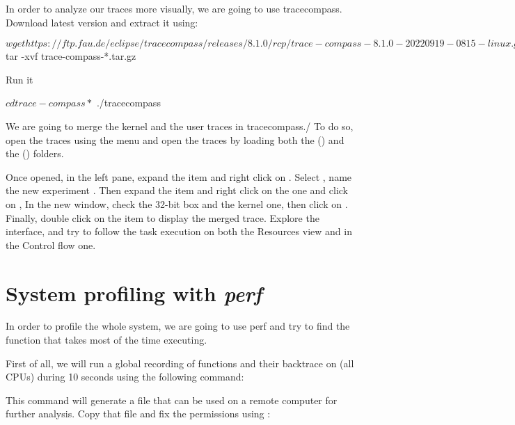 In order to analyze our traces more visually, we are going to use tracecompass.
Download  latest version and extract it using:

\begin{bashinput}
$ wget https://ftp.fau.de/eclipse/tracecompass/releases/8.1.0/rcp/trace-compass-8.1.0-20220919-0815-linux.gtk.x86_64.tar.gz
$ tar -xvf trace-compass-*.tar.gz
\end{bashinput}

Run it
\begin{bashinput}
$ cd trace-compass*
$ ./tracecompass
\end{bashinput}

We are going to merge the kernel and the user traces in tracecompass./ To do so,
open the traces using the  menu and open the traces
by loading both the  () and the 
() folders.

Once opened, in the left pane, expand the  item and right click
on . Select , name the new experiment
. Then expand the  item and right click on
the  one and click on , In the new
window, check the 32-bit box and the kernel one, then click on .
Finally, double click on the  item to display the merged
trace. Explore the interface, and try to follow the task execution on both the
Resources view and in the Control flow one.

\section{System profiling with {\em perf}}

In order to profile the whole system, we are going to use perf and try to find
the function that takes most of the time executing.

First of all, we will run a global recording of functions and their backtrace on
(all CPUs) during 10 seconds using the following command:


This command will generate a  file that can be used on a remote
computer for further analysis. Copy that file and fix the permissions using
:


